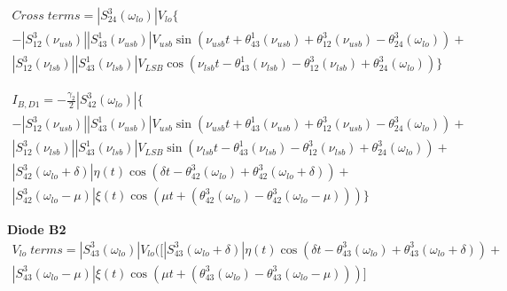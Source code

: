 \vspace{0.5cm}

\begin{equation}
    \begin{gathered}
    Cross\;terms = |S_{24}^3(\omega_{lo})|V_{lo}\big\{ \\
    -|S_{12}^3(\nu_{usb})||S_{43}^1(\nu_{usb})|V_{usb}\sin(\nu_{usb}t+\theta_{43}^1(\nu_{usb})+\theta_{12}^3(\nu_{usb})-\theta_{24}^3(\omega_{lo}))+\\
    |S_{12}^3(\nu_{lsb})||S_{43}^1(\nu_{lsb})|V_{LSB}\cos(\nu_{lsb}t-\theta_{43}^1(\nu_{lsb})-\theta_{12}^3(\nu_{lsb})+\theta_{24}^3(\omega_{lo})) 
    \big\}
    \end{gathered}
\end{equation}

\begin{equation}
\boxed{
\begin{gathered}
    I_{B,D1} = -\frac{\gamma_{2}}{2}|S_{42}^3(\omega_{lo})|\big\{ \\
    -|S_{12}^3(\nu_{usb})||S_{43}^1(\nu_{usb})|V_{usb}\sin(\nu_{usb}t+\theta_{43}^1(\nu_{usb})+\theta_{12}^3(\nu_{usb})-\theta_{24}^3(\omega_{lo}))+\\
    |S_{12}^3(\nu_{lsb})||S_{43}^1(\nu_{lsb})|V_{LSB}\sin(\nu_{lsb}t-\theta_{43}^1(\nu_{lsb})-\theta_{12}^3(\nu_{lsb})+\theta_{24}^3(\omega_{lo})) + \\
    |S_{42}^3(\omega_{lo}+\delta)|\eta(t)
    \cos(\delta t-\theta_{42}^3(\omega_{lo})+\theta_{42}^3(\omega_{lo}+\delta)) + \\
    |S_{42}^3(\omega_{lo}-\mu)|\xi(t)\cos(\mu t+(\theta_{42}^3(\omega_{lo})-\theta_{42}^3(\omega_{lo}-\mu)))
    \big\}
\end{gathered}
}
\end{equation}


\vspace{0.5cm}
\textbf{Diode B2}
\vspace{0.5cm}
\begin{equation}
\begin{gathered}
    V_{lo}\;terms = |S_{43}^3(\omega_{lo})|V_{lo}\big([ |S_{43}^3(\omega_{lo}+\delta)|\eta(t)
    \cos(\delta t-\theta_{43}^3(\omega_{lo})+\theta_{43}^3(\omega_{lo}+\delta)) + \\
    |S_{43}^3(\omega_{lo}-\mu)|\xi(t)\cos(\mu t+(\theta_{43}^3(\omega_{lo})-\theta_{43}^3(\omega_{lo}-\mu)))
    \big]
\end{gathered}
\end{equation}

